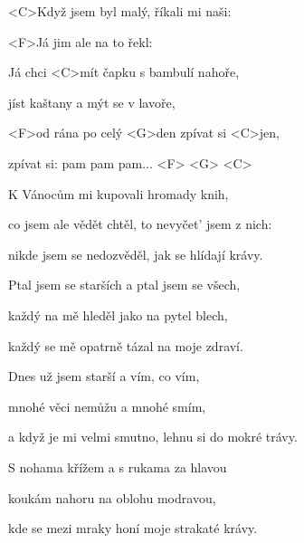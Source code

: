

\zs
<C>Když jsem byl malý, říkali mi naši:


<F>Já jim ale na to řekl: 
\ks

\zr
Já chci <C>mít čapku s bambulí nahoře,

jíst kaštany a mýt se v lavoře,

<F>od rána po celý <G>den zpívat si <C>jen,

zpívat si: pam pam pam... <F> <G> <C>
\kr

\zs
K Vánocům mi kupovali hromady knih,

co jsem ale vědět chtěl, to nevyčet' jsem z nich:

nikde jsem se nedozvěděl, jak se hlídají krávy.

Ptal jsem se starších a ptal jsem se všech,

každý na mě hleděl jako na pytel blech,

každý se mě opatrně tázal na moje zdraví.
\ks

\zr \kr

\zs
Dnes už jsem starší a vím, co vím,

mnohé věci nemůžu a mnohé smím,

a když je mi velmi smutno, lehnu si do mokré trávy.

S nohama křížem a s rukama za hlavou

koukám nahoru na oblohu modravou,

kde se mezi mraky honí moje strakaté krávy.
\ks

\zr \kr

\kp
